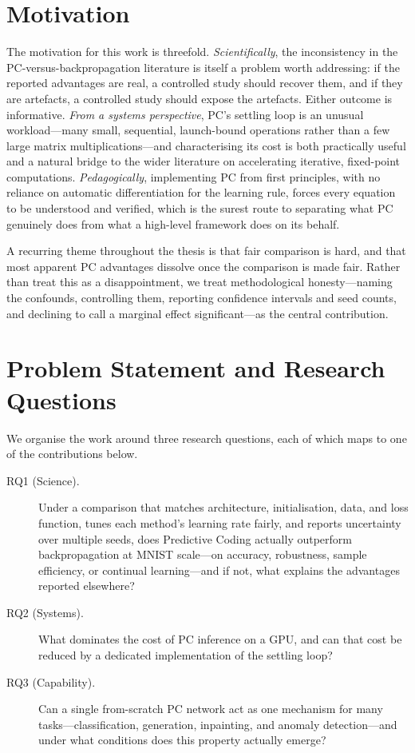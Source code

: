 \section{Motivation}

The motivation for this work is threefold. \emph{Scientifically}, the inconsistency in the
PC-versus-backpropagation literature is itself a problem worth addressing: if the reported
advantages are real, a controlled study should recover them, and if they are artefacts, a
controlled study should expose the artefacts. Either outcome is informative. \emph{From a
systems perspective}, PC's settling loop is an unusual workload---many small, sequential,
launch-bound operations rather than a few large matrix multiplications---and characterising its
cost is both practically useful and a natural bridge to the wider literature on accelerating
iterative, fixed-point computations. \emph{Pedagogically}, implementing PC from first
principles, with no reliance on automatic differentiation for the learning rule, forces every
equation to be understood and verified, which is the surest route to separating what PC
genuinely does from what a high-level framework does on its behalf.

A recurring theme throughout the thesis is that fair comparison is hard, and that most apparent
PC advantages dissolve once the comparison is made fair. Rather than treat this as a
disappointment, we treat methodological honesty---naming the confounds, controlling them,
reporting confidence intervals and seed counts, and declining to call a marginal effect
significant---as the central contribution.

\section{Problem Statement and Research Questions}

We organise the work around three research questions, each of which maps to one of the
contributions below.

\begin{description}
  \item[RQ1 (Science).] Under a comparison that matches architecture, initialisation, data, and
    loss function, tunes each method's learning rate fairly, and reports uncertainty over
    multiple seeds, does Predictive Coding actually outperform backpropagation at MNIST scale---on
    accuracy, robustness, sample efficiency, or continual learning---and if not, what explains
    the advantages reported elsewhere?
  \item[RQ2 (Systems).] What dominates the cost of PC inference on a GPU, and can that cost be
    reduced by a dedicated implementation of the settling loop?
  \item[RQ3 (Capability).] Can a single from-scratch PC network act as one mechanism for many
    tasks---classification, generation, inpainting, and anomaly detection---and under what
    conditions does this property actually emerge?
\end{description}

